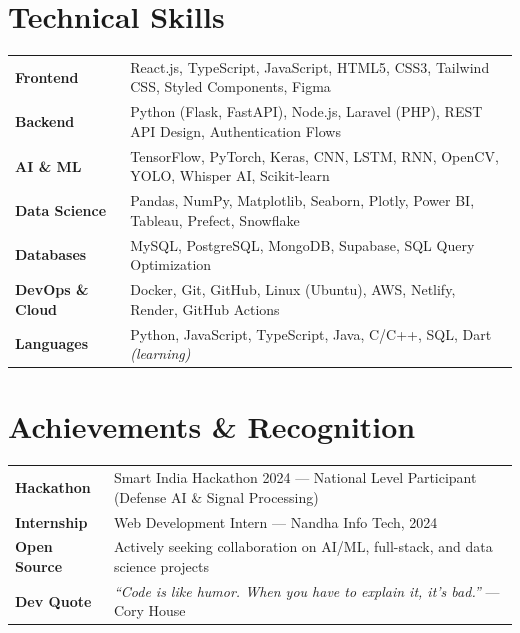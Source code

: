 \documentclass[a4paper,11pt]{article}
\begin{document}
\section{Technical Skills}

\begin{tabularx}{\linewidth}{@{}l X@{}}
\textbf{Frontend}        & React.js, TypeScript, JavaScript, HTML5, CSS3, Tailwind CSS, Styled Components, Figma \\[3pt]
\textbf{Backend}         & Python (Flask, FastAPI), Node.js, Laravel (PHP), REST API Design, Authentication Flows \\[3pt]
\textbf{AI \& ML}        & TensorFlow, PyTorch, Keras, CNN, LSTM, RNN, OpenCV, YOLO, Whisper AI, Scikit-learn \\[3pt]
\textbf{Data Science}    & Pandas, NumPy, Matplotlib, Seaborn, Plotly, Power BI, Tableau, Prefect, Snowflake \\[3pt]
\textbf{Databases}       & MySQL, PostgreSQL, MongoDB, Supabase, SQL Query Optimization \\[3pt]
\textbf{DevOps \& Cloud} & Docker, Git, GitHub, Linux (Ubuntu), AWS, Netlify, Render, GitHub Actions \\[3pt]
\textbf{Languages}       & Python, JavaScript, TypeScript, Java, C/C++, SQL, Dart \textit{(learning)} \\
\end{tabularx}

\section{Achievements \& Recognition}
\begin{tabularx}{\linewidth}{@{}l X@{}}
\textbf{Hackathon}    & Smart India Hackathon 2024 --- National Level Participant (Defense AI \& Signal Processing) \\[3pt]
\textbf{Internship}   & Web Development Intern --- Nandha Info Tech, 2024 \\[3pt]
\textbf{Open Source}  & Actively seeking collaboration on AI/ML, full-stack, and data science projects \\[3pt]
\textbf{Dev Quote}    & \textit{``Code is like humor. When you have to explain it, it's bad.''} --- Cory House \\
\end{tabularx}
\end{document}
